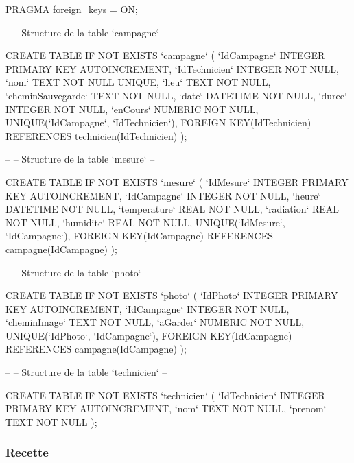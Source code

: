 \begin{DoxyCode}
PRAGMA foreign\_keys = ON;

--
-- Structure de la table `campagne`
--

CREATE TABLE IF NOT EXISTS `campagne` (
    `IdCampagne`    INTEGER PRIMARY KEY AUTOINCREMENT,
    `IdTechnicien`  INTEGER NOT NULL,
    `nom`   TEXT NOT NULL UNIQUE,
    `lieu`  TEXT NOT NULL,
    `cheminSauvegarde`  TEXT NOT NULL,
    `date`  DATETIME NOT NULL,
    `duree` INTEGER NOT NULL,
    `enCours` NUMERIC NOT NULL,
    UNIQUE(`IdCampagne`, `IdTechnicien`),
    FOREIGN KEY(IdTechnicien) REFERENCES technicien(IdTechnicien)
);

--
-- Structure de la table `mesure`
--

CREATE TABLE IF NOT EXISTS `mesure` (
    `IdMesure`  INTEGER PRIMARY KEY AUTOINCREMENT,
    `IdCampagne`    INTEGER NOT NULL,
    `heure` DATETIME NOT NULL,
    `temperature`   REAL NOT NULL,
    `radiation` REAL NOT NULL,
    `humidite`  REAL NOT NULL,  
    UNIQUE(`IdMesure`, `IdCampagne`),
    FOREIGN KEY(IdCampagne) REFERENCES campagne(IdCampagne)
);

--
-- Structure de la table `photo`
--

CREATE TABLE IF NOT EXISTS `photo` (
    `IdPhoto`   INTEGER PRIMARY KEY AUTOINCREMENT,
    `IdCampagne`    INTEGER NOT NULL,
    `cheminImage`   TEXT NOT NULL,
    `aGarder`   NUMERIC NOT NULL,
    UNIQUE(`IdPhoto`, `IdCampagne`),
    FOREIGN KEY(IdCampagne) REFERENCES campagne(IdCampagne) 
);

--
-- Structure de la table `technicien`
--

CREATE TABLE IF NOT EXISTS `technicien` (
    `IdTechnicien`  INTEGER PRIMARY KEY AUTOINCREMENT,
    `nom`   TEXT NOT NULL,
    `prenom`    TEXT NOT NULL
);
\end{DoxyCode}
\hypertarget{page__r_e_a_d_m_e_recette}{}\subsubsection{Recette}\label{page__r_e_a_d_m_e_recette}

